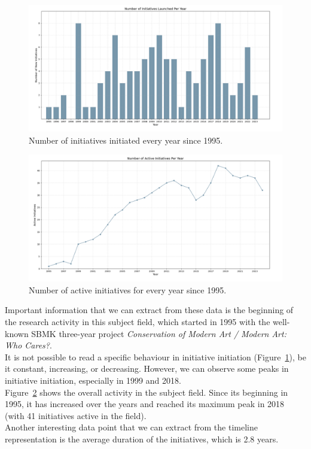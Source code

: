 \begin{figure}[!h]
    \centering
    \includegraphics[width=\textwidth]{chapters/1-state_of_the_art/image/plot01-lunchedproject.png}
    \caption{Number of initiatives initiated every year since 1995.}
    \label{fig:c1-launched}
\end{figure}

\begin{figure}[!h]
    \centering
    \includegraphics[width=\textwidth]{chapters/1-state_of_the_art/image/plot01-activeproject.png}
    \caption{Number of active initiatives for every year since 1995.}
    \label{fig:c1-active}
\end{figure}

Important information that we can extract from these data is the beginning of the research activity in this subject field, which started in 1995 with the well-known SBMK three-year project \textit{Conservation of Modern Art / Modern Art: Who Cares?}.\\
It is not possible to read a specific behaviour in initiative initiation (Figure~\ref{fig:c1-launched}), be it constant, increasing, or decreasing. However, we can observe some peaks in initiative initiation, especially in 1999 and 2018.\\ 
Figure~\ref{fig:c1-active} shows the overall activity in the subject field. Since its beginning in 1995, it has increased over the years and reached its maximum peak in 2018 (with 41 initiatives active in the field).\\
Another interesting data point that we can extract from the timeline representation is the average duration of the initiatives, which is 2.8 years.

